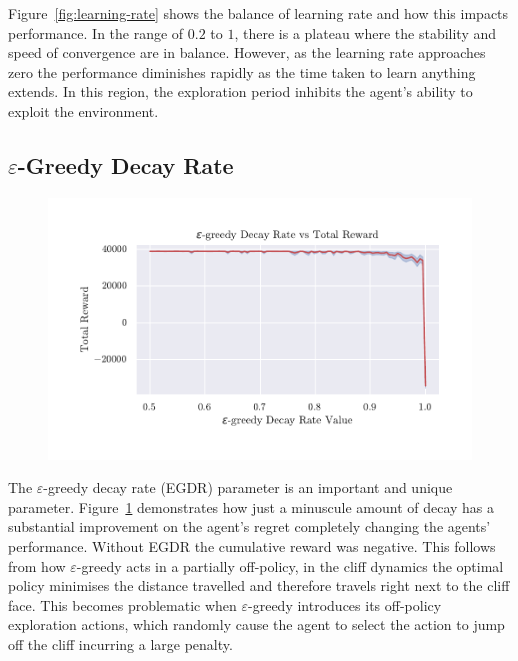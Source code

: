 \documentclass[]{final_report}
\begin{document}
\newpage
Figure~\ref {fig:learning-rate} shows the balance of learning rate and how this impacts performance. In the range of $0.2$ to $1$, there is a plateau where the stability and speed of convergence are in balance. However, as the learning rate approaches zero the performance diminishes rapidly as the time taken to learn anything extends. In this region, the exploration period inhibits the agent's ability to exploit the environment.

\subsection{\texorpdfstring{$\varepsilon$}{Lg}-Greedy Decay Rate}\label{edgr-section}

\begin{figure}[H]
  \centering
  
  \includegraphics[trim={0 1cm 0 1cm},clip,width=\textwidth]{hyper-paramiters/epsilon-greedy-decay-full}
  
  \caption{\label{fig:epsilon-greedy-decay-full}}
\end{figure}

The $\varepsilon$-greedy decay rate (EGDR) parameter is an important and unique parameter. Figure~\ref{fig:epsilon-greedy-decay-full} demonstrates how just a minuscule amount of decay has a substantial improvement on the agent's regret completely changing the agents' performance. Without EGDR the cumulative reward was negative. This follows from how $\varepsilon$-greedy acts in a partially off-policy, in the cliff dynamics the optimal policy minimises the distance travelled and therefore travels right next to the cliff face. This becomes problematic when $\varepsilon$-greedy introduces its off-policy exploration actions, which randomly cause the agent to select the action to jump off the cliff incurring a large penalty.
\end{document}
